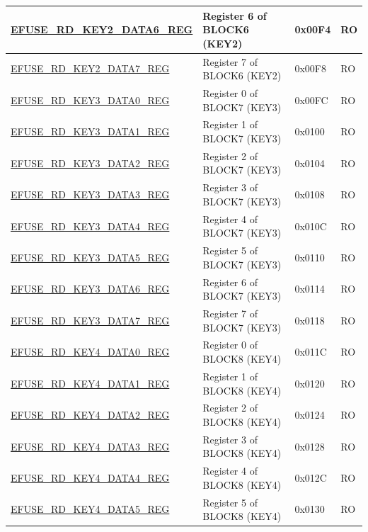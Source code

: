 \begin{longtable}{ | p{6cm} | p{7.2cm} | p{1.3cm} | p{1cm} | }
\hyperref[regdesc:EFUSERDKEY2DATA6REG]{EFUSE\_RD\_KEY2\_DATA6\_REG} & Register 6 of BLOCK6 (KEY2)  & 0x00F4 & RO \\ \hline
\hyperref[regdesc:EFUSERDKEY2DATA7REG]{EFUSE\_RD\_KEY2\_DATA7\_REG} & Register 7 of BLOCK6 (KEY2)  & 0x00F8 & RO \\ \hline
\hyperref[regdesc:EFUSERDKEY3DATA0REG]{EFUSE\_RD\_KEY3\_DATA0\_REG} & Register 0 of BLOCK7 (KEY3)  & 0x00FC & RO \\ \hline
\hyperref[regdesc:EFUSERDKEY3DATA1REG]{EFUSE\_RD\_KEY3\_DATA1\_REG} & Register 1 of BLOCK7 (KEY3)  & 0x0100 & RO \\ \hline
\hyperref[regdesc:EFUSERDKEY3DATA2REG]{EFUSE\_RD\_KEY3\_DATA2\_REG} & Register 2 of BLOCK7 (KEY3)  & 0x0104 & RO \\ \hline
\hyperref[regdesc:EFUSERDKEY3DATA3REG]{EFUSE\_RD\_KEY3\_DATA3\_REG} & Register 3 of BLOCK7 (KEY3)  & 0x0108 & RO \\ \hline
\hyperref[regdesc:EFUSERDKEY3DATA4REG]{EFUSE\_RD\_KEY3\_DATA4\_REG} & Register 4 of BLOCK7 (KEY3)  & 0x010C & RO \\ \hline
\hyperref[regdesc:EFUSERDKEY3DATA5REG]{EFUSE\_RD\_KEY3\_DATA5\_REG} & Register 5 of BLOCK7 (KEY3)  & 0x0110 & RO \\ \hline
\hyperref[regdesc:EFUSERDKEY3DATA6REG]{EFUSE\_RD\_KEY3\_DATA6\_REG} & Register 6 of BLOCK7 (KEY3)  & 0x0114 & RO \\ \hline
\hyperref[regdesc:EFUSERDKEY3DATA7REG]{EFUSE\_RD\_KEY3\_DATA7\_REG} & Register 7 of BLOCK7 (KEY3)  & 0x0118 & RO \\ \hline
\hyperref[regdesc:EFUSERDKEY4DATA0REG]{EFUSE\_RD\_KEY4\_DATA0\_REG} & Register 0 of BLOCK8 (KEY4)  & 0x011C & RO \\ \hline
\hyperref[regdesc:EFUSERDKEY4DATA1REG]{EFUSE\_RD\_KEY4\_DATA1\_REG} & Register 1 of BLOCK8 (KEY4)  & 0x0120 & RO \\ \hline
\hyperref[regdesc:EFUSERDKEY4DATA2REG]{EFUSE\_RD\_KEY4\_DATA2\_REG} & Register 2 of BLOCK8 (KEY4)  & 0x0124 & RO \\ \hline
\hyperref[regdesc:EFUSERDKEY4DATA3REG]{EFUSE\_RD\_KEY4\_DATA3\_REG} & Register 3 of BLOCK8 (KEY4)  & 0x0128 & RO \\ \hline
\hyperref[regdesc:EFUSERDKEY4DATA4REG]{EFUSE\_RD\_KEY4\_DATA4\_REG} & Register 4 of BLOCK8 (KEY4)  & 0x012C & RO \\ \hline
\hyperref[regdesc:EFUSERDKEY4DATA5REG]{EFUSE\_RD\_KEY4\_DATA5\_REG} & Register 5 of BLOCK8 (KEY4)  & 0x0130 & RO \\ \hline

\end{longtable}
